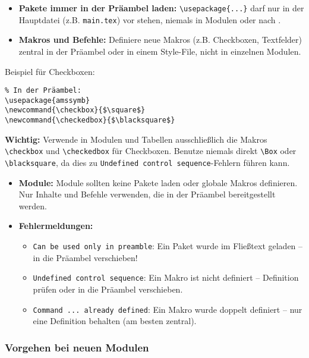 \begin{itemize}
\tightlist
\item
  \textbf{Pakete immer in der Präambel laden:}
  \verb|\usepackage{...}| darf nur in der Hauptdatei (z.B. \texttt{main.tex}) vor \verb|| stehen, niemals in Modulen oder nach \verb||.
\item
  \textbf{Makros und Befehle:}
  Definiere neue Makros (z.B. Checkboxen, Textfelder) zentral in der Präambel oder in einem Style-File, nicht in einzelnen Modulen.
\end{itemize}

Beispiel für Checkboxen:
\begin{verbatim}
% In der Präambel:
\usepackage{amssymb}
\newcommand{\checkbox}{$\square$}
\newcommand{\checkedbox}{$\blacksquare$}
\end{verbatim}

\textbf{Wichtig:} Verwende in Modulen und Tabellen ausschließlich die Makros \verb|\checkbox| und \verb|\checkedbox| für Checkboxen. Benutze niemals direkt \verb|\Box| oder \verb|\blacksquare|, da dies zu \texttt{Undefined control sequence}-Fehlern führen kann.

\begin{itemize}
\tightlist
\item
  \textbf{Module:}
  Module sollten keine Pakete laden oder globale Makros definieren.
  Nur Inhalte und Befehle verwenden, die in der Präambel bereitgestellt werden.
\item
  \textbf{Fehlermeldungen:}
  \begin{itemize}
  \tightlist
  \item
    \texttt{Can be used only in preamble}: Ein Paket wurde im Fließtext geladen -- in die Präambel verschieben!
  \item
    \texttt{Undefined control sequence}: Ein Makro ist nicht definiert -- Definition prüfen oder in die Präambel verschieben.
  \item
    \texttt{Command ... already defined}: Ein Makro wurde doppelt definiert -- nur eine Definition behalten (am besten zentral).
  \end{itemize}
\end{itemize}

\hypertarget{vorgehen-bei-neuen-modulen}{%
\subsubsection{Vorgehen bei neuen Modulen}\label{vorgehen-bei-neuen-modulen}}

